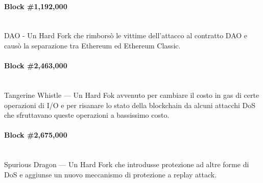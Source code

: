\paragraph{Block \#1,192,000} \ \\
DAO - Un Hard Fork che rimborsò le vittime dell'attacco al contratto DAO e causò
la separazione tra Ethereum ed Ethereum Classic.

\paragraph{Block \#2,463,000} \ \\
Tangerine Whistle — Un Hard Fok avvenuto per cambiare il costo in gas di certe
operazioni di I/O e per risanare lo stato della blockchain da alcuni attacchi
DoS che sfruttavano queste operazioni a bassissimo costo.

\paragraph{Block \#2,675,000} \ \\
Spurious Dragon — Un Hard Fork che introdusse protezione ad altre forme di DoS
e aggiunse un nuovo meccanismo di protezione a replay attack.